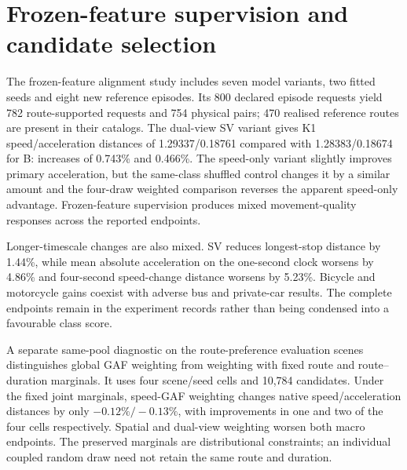 \section{Frozen-feature supervision and candidate selection}

The frozen-feature alignment study includes seven model variants, two fitted seeds and eight new reference episodes. Its 800 declared episode requests yield 782 route-supported requests and 754 physical pairs; 470 realised reference routes are present in their catalogs. The dual-view SV variant gives K1 speed/acceleration distances of 1.29337/0.18761 compared with 1.28383/0.18674 for B: increases of 0.743\% and 0.466\%. The speed-only variant slightly improves primary acceleration, but the same-class shuffled control changes it by a similar amount and the four-draw weighted comparison reverses the apparent speed-only advantage. Frozen-feature supervision produces mixed movement-quality responses across the reported endpoints.

Longer-timescale changes are also mixed. SV reduces longest-stop distance by 1.44\%, while mean absolute acceleration on the one-second clock worsens by 4.86\% and four-second speed-change distance worsens by 5.23\%. Bicycle and motorcycle gains coexist with adverse bus and private-car results. The complete endpoints remain in the experiment records rather than being condensed into a favourable class score.

A separate same-pool diagnostic on the route-preference evaluation scenes distinguishes global GAF weighting from weighting with fixed route and route--duration marginals. It uses four scene/seed cells and 10,784 candidates. Under the fixed joint marginals, speed-GAF weighting changes native speed/acceleration distances by only $-0.12\%/-0.13\%$, with improvements in one and two of the four cells respectively. Spatial and dual-view weighting worsen both macro endpoints. The preserved marginals are distributional constraints; an individual coupled random draw need not retain the same route and duration.


